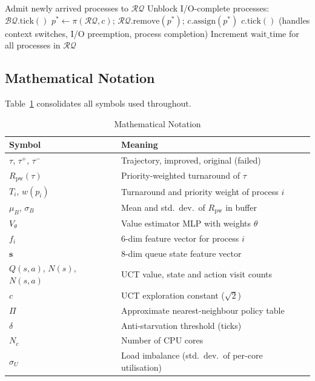 \documentclass[10pt,journal,compsoc]{IEEEtran}
\begin{document}
\begin{algorithm}[!t]
\caption{SMP Simulator: one tick}
\label{alg:smp}
\begin{algorithmic}[1]
\State Admit newly arrived processes to $\mathcal{RQ}$
\State Unblock I/O-complete processes: $\mathcal{BQ}.\text{tick}()$
    \State $p^* \leftarrow \pi(\mathcal{RQ}, c)$;\;
           $\mathcal{RQ}.\text{remove}(p^*)$;\;
           $c.\text{assign}(p^*)$
  \EndIf
\EndFor
{}
  \State $c.\text{tick}()$\;
         (handles context switches, I/O preemption, process completion)
\EndFor
\State Increment $\text{wait\_time}$ for all processes in $\mathcal{RQ}$
\end{algorithmic}
\end{algorithm}

\subsection{Mathematical Notation}

Table~\ref{tab:notation} consolidates all symbols used throughout.

\begin{table}[!t]
\centering
\caption{Mathematical Notation}
\label{tab:notation}
\renewcommand{\arraystretch}{1.1}
\begin{tabular}{@{}l p{5.5cm}@{}}
\toprule
\textbf{Symbol} & \textbf{Meaning} \\
\midrule
$\tau$, $\tau^+$, $\tau^-$ & Trajectory, improved, original (failed) \\
$R_{\text{pw}}(\tau)$       & Priority-weighted turnaround of $\tau$ \\
$T_i$, $w(p_i)$             & Turnaround and priority weight of process $i$ \\
$\mu_B$, $\sigma_B$         & Mean and std.\ dev.\ of $R_{\text{pw}}$ in buffer \\
$V_\theta$                  & Value estimator MLP with weights $\theta$ \\
$f_i$                       & 6-dim feature vector for process $i$ \\
$\mathbf{s}$                & 8-dim queue state feature vector \\
$Q(s,a)$, $N(s)$, $N(s,a)$ & UCT value, state and action visit counts \\
$c$                         & UCT exploration constant ($\sqrt{2}$) \\
$\Pi$                       & Approximate nearest-neighbour policy table \\
$\delta$                    & Anti-starvation threshold (ticks) \\
$N_c$                       & Number of CPU cores \\
$\sigma_U$                  & Load imbalance (std.\ dev.\ of per-core utilisation) \\
\bottomrule
\end{tabular}
\end{table}
\end{document}
